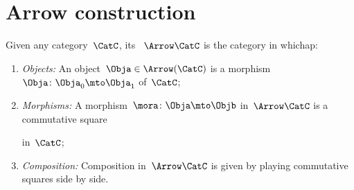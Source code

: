 
\section{Arrow construction}


\begin{ctdefinition}
    \label{def:arrow_category}
    Given any category~$\CatC$, its \emph{}~$\Arrow \CatC$ is the category in whichap:
    \begin{enumerate}
        \item \emph{Objects:} An object~$\Obja \in \Arrow(\CatC)$ is a morphism~$\Obja\colon \Obja_0\mto \Obja_1$ of~$\CatC$;
        \item \emph{Morphisms:} A morphism~$\mora\colon \Obja \mto \Objb$ in~$\Arrow \CatC$ is a commutative square
              \begin{center}
              \end{center}
              in~$\CatC$;
        \item \emph{Composition:} Composition in~$\Arrow \CatC$ is given by playing commutative squares side by side.
    \end{enumerate}
\end{ctdefinition}
